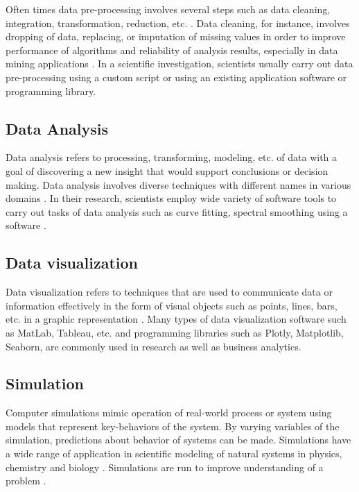 Often times data pre-processing involves several steps such as data cleaning, integration, transformation, reduction, etc. \citep{malley2016data}. Data cleaning, for instance, involves dropping of data, replacing, or imputation of missing values in order to improve performance of algorithms and reliability of analysis results, especially in data mining applications \citep{enwiki:1051181443, enwiki:1056727993}. In a scientific investigation, scientists usually carry out data pre-processing using a custom script or using an existing application software or programming library. 



\subsection{Data Analysis}
\label{sec:purpose:Types:Analysis}

Data analysis refers to processing, transforming, modeling, etc. of data with a goal of discovering a new insight that would support conclusions or decision making. Data analysis involves diverse techniques with different names in various domains \citep{enwiki:1061024140}. In their research, scientists employ wide variety of software tools to carry out tasks of data analysis such as  curve fitting, spectral smoothing using a software \citep{proctor1982data}. 

\subsection{Data visualization}
\label{sec:purpose:Types:visualization}

Data visualization refers to techniques that are used to communicate data or information effectively in the form of visual objects such as points, lines, bars, etc. in a graphic representation \citep{enwiki:1059912747}. Many types of data visualization software such as MatLab, Tableau, etc. and programming libraries such as Plotly, Matplotlib, Seaborn, are commonly used in research as well as business analytics. 

\subsection{Simulation}
\label{sec:purpose:Types:Simulation}

Computer simulations mimic operation of real-world process or system using models that represent key-behaviors of the system. By varying variables of the simulation, predictions about behavior of systems can be made. Simulations have a wide range of application in scientific modeling of natural systems in physics, chemistry and biology \citep{enwiki:1061669086}. Simulations are run to improve understanding of a problem  \citep{segal2008developing}.


